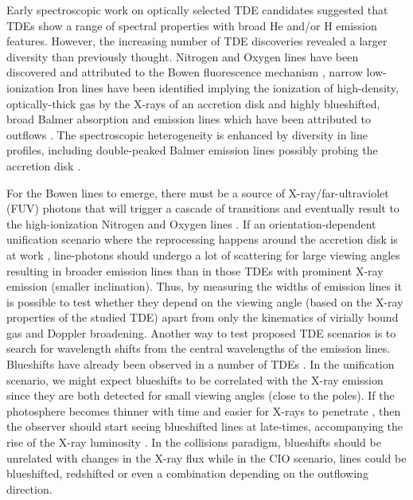 \documentclass[structabstract]{aa}
\begin{document}
Early spectroscopic work on optically selected TDE candidates \citep{Arcavi2014} suggested that TDEs show a range of spectral properties with broad He and/or H emission features. However, the increasing number of TDE discoveries revealed a larger diversity than previously thought. Nitrogen and Oxygen lines have been discovered \citep{Blagorodnova2018,Leloudas2019,Onori2019} and attributed to the Bowen fluorescence mechanism \citep{Bowen1934,Bowen1935}, narrow low-ionization Iron lines have been identified implying the ionization of high-density, optically-thick gas by the X-rays of an accretion disk \citep{Wevers2019,Cannizzaro2021} and highly blueshifted, broad Balmer absorption and emission lines which have been attributed to outflows \citep{Hung2019,Nicholl2020}.
The spectroscopic heterogeneity is enhanced by diversity in line profiles, including double-peaked Balmer emission lines possibly probing the accretion disk \citep{Short2020a,Hung2020}.

For the Bowen lines to emerge, there must be a source of X-ray/far-ultraviolet (FUV) photons that will trigger a cascade of transitions and eventually result to the high-ionization Nitrogen and Oxygen lines \citep{Leloudas2019}. If an orientation-dependent unification scenario where the reprocessing happens around the accretion disk is at work \citep[such as the one proposed by][]{Dai2018}, line-photons should undergo a lot of scattering \citep{Roth2017} for large viewing angles resulting in broader emission lines than in those TDEs with prominent X-ray emission (smaller inclination). Thus, by measuring the widths of emission lines it is possible to test whether they depend on the viewing angle (based on the X-ray properties of the studied TDE) apart from only the kinematics of virially bound gas and Doppler broadening.
Another way to test proposed TDE scenarios is to search for wavelength shifts from the central wavelengths of the emission lines. Blueshifts have already been observed in a number of TDEs \citep{Arcavi2014,Holoien2015,Nicholl2020}. In the \citet{Dai2018} unification scenario, we might expect blueshifts to be correlated with the X-ray emission since they are both detected for small viewing angles (close to the poles). If the photosphere becomes thinner with time and easier for X-rays to penetrate \citep{Jonker2020}, then the observer should start seeing blueshifted lines at late-times, accompanying the rise of the X-ray luminosity \citep{Nicholl2019}. In the collisions paradigm, blueshifts should be unrelated with changes in the X-ray flux while in the CIO scenario, lines could be blueshifted, redshifted or even a combination depending on the outflowing direction. 
\end{document}
